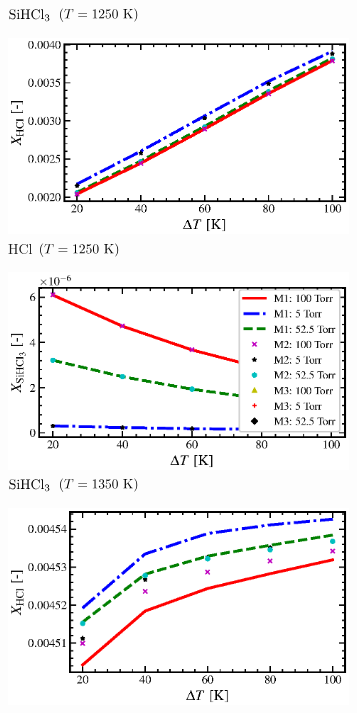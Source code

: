 \documentclass[final, letterpaper, square, comma, numbers, sort&compress]{elsarticle}
\begin{document}
\begin{figure}
\begin{subfigure}{0.49\textwidth}
        \caption{$\rm SiHCl_3$ $(T=1250\rm\ K)$}
    \end{subfigure}
    \begin{subfigure}{0.49\textwidth}
        \centering
        \includegraphics[width=0.99\textwidth]{dT-vs-HCl-T-1250-compare}
        \caption{HCl $(T=1250\rm\ K)$}
    \end{subfigure}
    \begin{subfigure}{0.49\textwidth}
        \centering
        \includegraphics[width=0.99\textwidth]{dT-vs-SiHCl3-T-1350-compare}
        \caption{$\rm SiHCl_3$ $(T=1350\rm\ K)$}
    \end{subfigure}
    \begin{subfigure}{0.49\textwidth}
        \centering
        \includegraphics[width=0.99\textwidth]{dT-vs-HCl-T-1350-compare}

\end{subfigure}
\end{figure}
\end{document}
